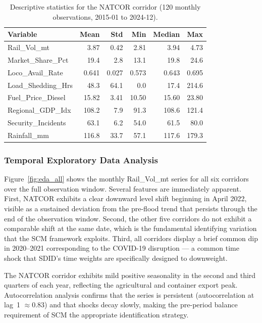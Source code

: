 \begin{table}[H]
  \centering
  \caption{Descriptive statistics for the NATCOR corridor
    (120 monthly observations, 2015-01 to 2024-12).}
  \label{tab:natcor_stats}
  \small
  \renewcommand{\arraystretch}{1.2}
  \begin{tabular}{lrrrrr}
    \toprule
    \textbf{Variable} & \textbf{Mean} & \textbf{Std} &
      \textbf{Min} & \textbf{Median} & \textbf{Max} \\
    \midrule
    Rail\_Vol\_mt       & 3.87  & 0.42  & 2.81  & 3.94  & 4.73  \\
    Market\_Share\_Pct  & 19.4  & 2.8   & 13.1  & 19.8  & 24.6  \\
    Loco\_Avail\_Rate   & 0.641 & 0.027 & 0.573 & 0.643 & 0.695 \\
    Load\_Shedding\_Hrs & 48.3  & 64.1  & 0.0   & 17.4  & 214.6 \\
    Fuel\_Price\_Diesel & 15.82 & 3.41  & 10.50 & 15.60 & 23.80 \\
    Regional\_GDP\_Idx  & 108.2 & 7.9   & 91.3  & 108.6 & 121.4 \\
    Security\_Incidents & 63.1  & 6.2   & 54.0  & 61.5  & 80.0  \\
    Rainfall\_mm        & 116.8 & 33.7  & 57.1  & 117.6 & 179.3 \\
    \bottomrule
  \end{tabular}
\end{table}

\subsubsection{Temporal Exploratory Data Analysis}
\label{sec:eda}

Figure~\ref{fig:eda_all} shows the monthly Rail\_Vol\_mt series for
all six corridors over the full observation window.
Several features are immediately apparent.
First, NATCOR exhibits a clear downward level shift beginning in
April 2022, visible as a sustained deviation from the pre-flood
trend that persists through the end of the observation window.
Second, the other five corridors do not exhibit a comparable shift
at the same date, which is the fundamental identifying variation
that the SCM framework exploits.
Third, all corridors display a brief common dip in 2020--2021
corresponding to the COVID-19 disruption --- a common time shock
that SDID's time weights are specifically designed to downweight.

The NATCOR corridor exhibits mild positive seasonality in the
second and third quarters of each year, reflecting the agricultural
and container export peak.
Autocorrelation analysis confirms that the series is persistent
(autocorrelation at lag~1 $\approx 0.83$) and that shocks decay
slowly, making the pre-period balance requirement of SCM the
appropriate identification strategy.

